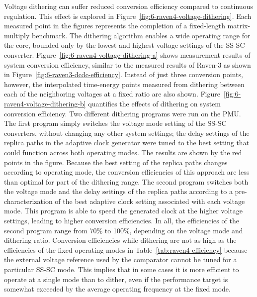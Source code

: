 \documentclass[graybox]{svmult}
\begin{document}
Voltage dithering can suffer reduced conversion efficiency compared to continuous regulation.
This effect is explored in Figure~\ref{fig:6-raven4-voltage-dithering}.
Each measured point in the figures represents the completion of a fixed-length matrix-multiply benchmark.
The dithering algorithm enables a wide operating range for the core, bounded only by the lowest and highest voltage settings of the SS-SC converter. 
Figure~\ref{fig:6-raven4-voltage-dithering-a} shows measurement results of system conversion efficiency, similar to the measured results of Raven-3 as shown in Figure~\ref{fig:6-raven3-dcdc-efficiency}.
Instead of just three conversion points, however, the interpolated time-energy points measured from dithering between each of the neighboring voltages at a fixed ratio are also shown.
Figure~\ref{fig:6-raven4-voltage-dithering-b} quantifies the effects of dithering on system conversion efficiency.
Two different dithering programs were run on the PMU.
The first program simply switches the voltage mode setting of the SS-SC converters, without changing any other system settings; the delay settings of the replica paths in the adaptive clock generator were tuned to the best setting that could function across both operating modes.
The results are shown by the red points in the figure.
Because the best setting of the replica paths changes according to operating mode, the conversion efficiencies of this approach are less than optimal for part of the dithering range.
The second program switches both the voltage mode and the delay settings of the replica paths according to a pre-characterization of the best adaptive clock setting associated with each voltage mode.
This program is able to speed the generated clock at the higher voltage settings, leading to higher conversion efficiencies.
In all, the efficiencies of the second program range from 70\% to 100\%, depending on the voltage mode and dithering ratio.
Conversion efficiencies while dithering are not as high as the efficiencies of the fixed operating modes in Table~\ref{tab:raven4-efficiency} because the external voltage reference used by the comparator cannot be tuned for a particular SS-SC mode.
This implies that in some cases it is more efficient to operate at a single mode than to dither, even if the performance target is somewhat exceeded by the average operating frequency at the fixed mode.
\end{document}
